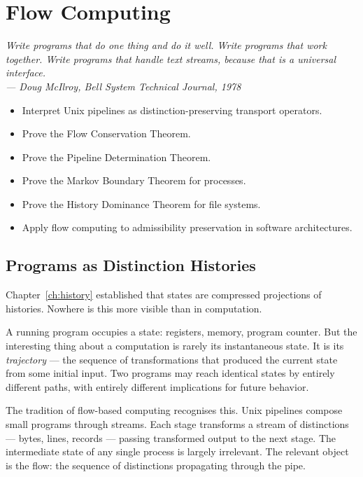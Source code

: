 \documentclass[12pt,twoside,openright]{book}
\newenvironment{epigraph}[2]{%
  \vspace{1em}\begin{flushright}
  \begin{minipage}{0.72\textwidth}
  \itshape\small #1\\[0.4em]
  \upshape\footnotesize\sffamily\color{DistGray}--- #2
  \end{minipage}\end{flushright}\vspace{1.5em}}{}
\newenvironment{objectives}{%
  \begin{tcolorbox}[colback=DistBlue!5,colframe=DistBlue,
    title={\faCheckCircle\enspace Learning Objectives},
    fonttitle=\sffamily\bfseries\color{white},
    attach boxed title to top left={yshift=-2mm,xshift=4mm},
    boxed title style={colback=DistBlue},breakable]
  \begin{itemize}[leftmargin=*,nosep]}{%
  \end{itemize}\end{tcolorbox}\vspace{1em}}
\begin{document}
\chapter{Flow Computing}
\label{ch:flow-computing}

\begin{epigraph}{%
  Write programs that do one thing and do it well.
  Write programs that work together.
  Write programs that handle text streams, because that is
  a universal interface.}%
  {Doug McIlroy, \textit{Bell System Technical Journal}, 1978}
\end{epigraph}

\begin{objectives}
  \item Interpret Unix pipelines as distinction-preserving
        transport operators.
  \item Prove the Flow Conservation Theorem.
  \item Prove the Pipeline Determination Theorem.
  \item Prove the Markov Boundary Theorem for processes.
  \item Prove the History Dominance Theorem for file systems.
  \item Apply flow computing to admissibility preservation
        in software architectures.
\end{objectives}

\section{Programs as Distinction Histories}

Chapter~\ref{ch:history} established that states are
compressed projections of histories. Nowhere is this
more visible than in computation.

A running program occupies a state: registers, memory,
program counter. But the interesting thing about a
computation is rarely its instantaneous state. It is its
\emph{trajectory} — the sequence of transformations that
produced the current state from some initial input. Two
programs may reach identical states by entirely different
paths, with entirely different implications for future
behavior.

The tradition of flow-based computing recognises this.
Unix pipelines compose small programs through streams.
Each stage transforms a stream of distinctions — bytes,
lines, records — passing transformed output to the next
stage. The intermediate state of any single process is
largely irrelevant. The relevant object is the flow: the
sequence of distinctions propagating through the pipe.
\end{document}
